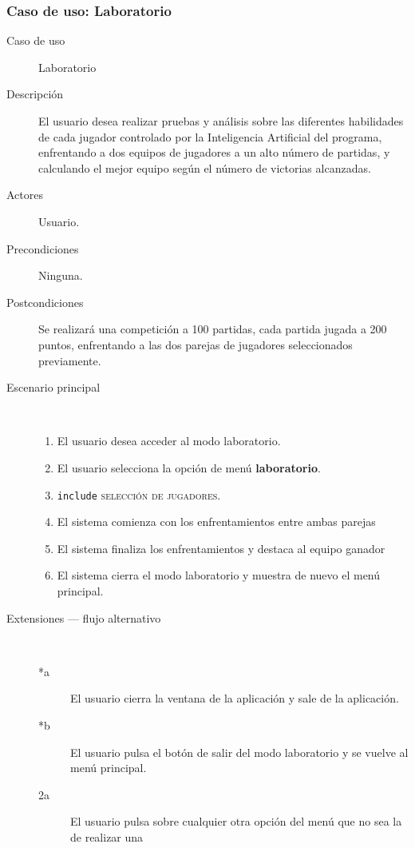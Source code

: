 \subsubsection{Caso de uso: Laboratorio}

\begin{description}
    \item[Caso de uso] Laboratorio
    \item[Descripción] El usuario desea realizar pruebas y análisis sobre las diferentes habilidades de cada jugador
            controlado por la Inteligencia Artificial del programa, enfrentando a dos equipos de jugadores a un alto
            número de partidas, y calculando el mejor equipo según el número de victorias alcanzadas.
    \item[Actores] Usuario.
    \item[Precondiciones] Ninguna.
    \item[Postcondiciones] Se realizará una competición a 100 partidas, cada partida jugada a 200 puntos, enfrentando
            a las dos parejas de jugadores seleccionados previamente.
    \item[Escenario principal] $\quad$
        \begin{enumerate}
            \item El usuario desea acceder al modo laboratorio.
            \item El usuario selecciona la opción de menú \textbf{laboratorio}.
            \item \texttt{include} \textsc{selección de jugadores}.
            \item El sistema comienza con los enfrentamientos entre ambas parejas
            \item El sistema finaliza los enfrentamientos y destaca al equipo ganador
            \item El sistema cierra el modo laboratorio y muestra de nuevo el menú principal.
        \end{enumerate}
    \item[Extensiones --- flujo alternativo] $\quad$
        \begin{description}
            \item[*a ] El usuario cierra la ventana de la aplicación y sale de la aplicación.
            \item[*b ] El usuario pulsa el botón de salir del modo laboratorio y se vuelve al menú principal.
            \item[2a ] El usuario pulsa sobre cualquier otra opción del menú que no sea la de realizar una

\end{description}
\end{description}

